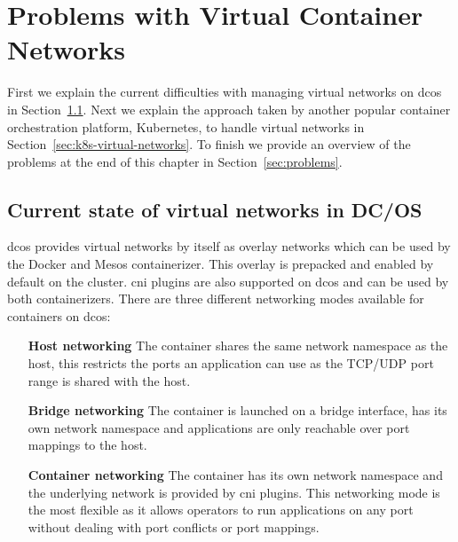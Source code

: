 \chapter{Problems with Virtual Container Networks}
\label{chap:research}
 First we explain the current difficulties with managing virtual networks on \gls{dcos} in Section~\ref{sec:current-state}. Next we explain the approach taken by another popular container orchestration platform, Kubernetes, to handle virtual networks in Section~\ref{sec:k8s-virtual-networks}. To finish we provide an overview of the problems at the end of this chapter in Section~\ref{sec:problems}.

\section{Current state of virtual networks in DC/OS}
\label{sec:current-state}
\Gls{dcos} provides virtual networks by itself as overlay networks which can be used by the Docker and Mesos containerizer. This overlay is prepacked and enabled by default on the cluster. \Gls{cni} plugins are also supported on \gls{dcos} and can be used by both containerizers. There are three different networking modes available for containers on \gls{dcos}:
\begin{itemize}
    \item[\textbf{Host networking}] The container shares the same network namespace as the host, this restricts the ports an application can use as the TCP/UDP port range is shared with the host.
    \item[\textbf{Bridge networking}] The container is launched on a bridge interface, has its own network namespace and applications are only reachable over port mappings to the host.
    \item[\textbf{Container networking}]  The container has its own network namespace and the underlying network is provided by \gls{cni} plugins. This networking mode is the most flexible as it allows operators to run applications on any port without dealing with port conflicts or port mappings.
\end{itemize}

